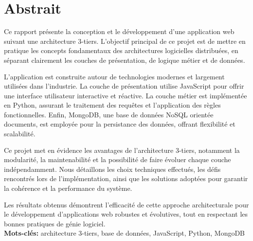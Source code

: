 \chapter*{\center \Large  Abstrait}
Ce rapport présente la conception et le développement d'une application web suivant une architecture 3-tiers. L'objectif principal de ce projet est de mettre en pratique les concepts fondamentaux des architectures logicielles distribuées, en séparant clairement les couches de présentation, de logique métier et de données.

L'application est construite autour de technologies modernes et largement utilisées dans l'industrie. La couche de présentation utilise JavaScript pour offrir une interface utilisateur interactive et réactive. La couche métier est implémentée en Python, assurant le traitement des requêtes et l'application des règles fonctionnelles. Enfin, MongoDB, une base de données NoSQL orientée documents, est employée pour la persistance des données, offrant flexibilité et scalabilité.

Ce projet met en évidence les avantages de l'architecture 3-tiers, notamment la modularité, la maintenabilité et la possibilité de faire évoluer chaque couche indépendamment. Nous détaillons les choix techniques effectués, les défis rencontrés lors de l'implémentation, ainsi que les solutions adoptées pour garantir la cohérence et la performance du système.

Les résultats obtenus démontrent l'efficacité de cette approche architecturale pour le développement d'applications web robustes et évolutives, tout en respectant les bonnes pratiques de génie logiciel.
~\\[1cm]
\noindent %
\textbf{Mots-clés:} architecture 3-tiers, base de données, JavaScript, Python, MongoDB

\vfill
\noindent
